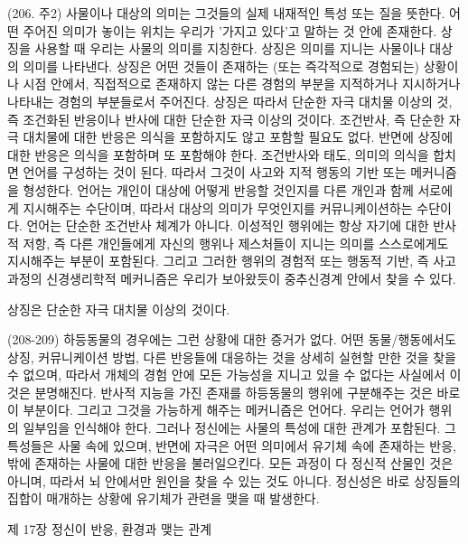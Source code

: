 \documentclass[11pt, a4paper]{article}
\begin{document}
(206. 주2) 사물이나 대상의 의미는 그것들의 실제 내재적인 특성 또는 질을 뜻한다. 어떤 주어진 의미가 놓이는 위치는 우리가 '가지고 있다'고 말하는 것 안에 존재한다. 상징을 사용할 때 우리는 사물의 의미를 지칭한다. 상징은 의미를 지니는 사물이나 대상의 의미를 나타낸다. 상징은 어떤 것들이 존재하는 (또는 즉각적으로 경험되는) 상황이나 시점 안에서, 직접적으로 존재하지 않는 다른 경험의 부분을 지적하거나 지시하거나 나타내는 경험의 부분들로서 주어진다. 상징은 따라서 단순한 자극 대치물 이상의 것, 즉 조건화된 반응이나 반사에 대한 단순한 자극 이상의 것이다. 조건반사, 즉 단순한 자극 대치물에 대한 반응은 의식을 포함하지도 않고 포함할 필요도 없다. 반면에 상징에 대한 반응은 의식을 포함하며 또 포함해야 한다. 조건반사와 태도, 의미의 의식을 합치면 언어를 구성하는 것이 된다. 따라서 그것이 사고와 지적 행동의 기반 또는 메커니즘을 형성한다. 언어는 개인이 대상에 어떻게 반응할 것인지를 다른 개인과 함께 서로에게 지시해주는 수단이며, 따라서 대상의 의미가 무엇인지를 커뮤니케이션하는 수단이다. 언어는 단순한 조건반사 체계가 아니다. 이성적인 행위에는 항상 자기에 대한 반사적 저항, 즉 다른 개인들에게 자신의 행위나 제스처들이 지니는 의미를 스스로에게도 지시해주는 부분이 포함된다. 그리고 그러한 행위의 경험적 또는 행동적 기반, 즉 사고과정의 신경생리학적 메커니즘은 우리가 보아왔듯이 중추신경계 안에서 찾을 수 있다.

상징은 단순한 자극 대치물 이상의 것이다.

(208-209) 하등동물의 경우에는 그런 상황에 대한 증거가 없다. 어떤 동물/행동에서도 상징, 커뮤니케이션 방법, 다른 반응들에 대응하는 것을 상세히 실현할 만한 것을 찾을 수 없으며, 따라서 개체의 경험 안에 모든 가능성을 지니고 있을 수 없다는 사실에서 이것은 분명해진다. 반사적 지능을 가진 존재를 하등동물의 행위에 구분해주는 것은 바로 이 부분이다. 그리고 그것을 가능하게 해주는 메커니즘은 언어다. 우리는 언어가 행위의 일부임을 인식해야 한다. 그러나 정신에는 사물의 특성에 대한 관계가 포함된다. 그 특성들은 사물 속에 있으며, 반면에 자극은 어떤 의미에서 유기체 속에 존재하는 반응, 밖에 존재하는 사물에 대한 반응을 불러일으킨다. 모든 과정이 다 정신적 산물인 것은 아니며, 따라서 뇌 안에서만 원인을 찾을 수 있는 것도 아니다. 정신성은 바로 상징들의 집합이 매개하는 상황에 유기체가 관련을 맺을 때 발생한다.

제 17장 정신이 반응, 환경과 맺는 관계

\newpage
\end{document}
